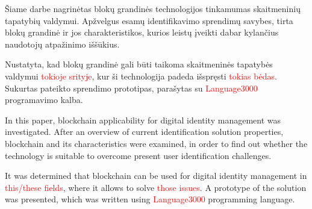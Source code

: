 Šiame darbe nagrinėtas blokų grandinės technologijos tinkamumas skaitmeninių tapatybių valdymui. Apžvelgus esamų
identifikavimo sprendimų savybes, tirta blokų grandinė ir jos charakteristikos, kurios leistų įveikti dabar kylančius
naudotojų atpažinimo iššūkius.


Nustatyta, kad blokų grandinė gali būti taikoma skaitmeninės tapatybės valdymui \textcolor{red}{tokioje srityje}, kur ši technologija
padeda išspręsti \textcolor{red}{tokias bėdas}. Sukurtas pateikto sprendimo prototipas, parašytas su \textcolor{red}{Language3000}
programavimo kalba.



In this paper, blockchain applicability for digital identity management was investigated. After an overview of current
identification solution properties, blockchain and its characteristics were examined, in order to find out whether the technology is suitable
to overcome present user identification challenges.


It was determined that blockchain can be used for digital identity management in \textcolor{red}{this/these fields}, where it allows to
solve \textcolor{red}{those issues}. A prototype of the solution was presented, which was written using \textcolor{red}{Language3000}
programming language.
